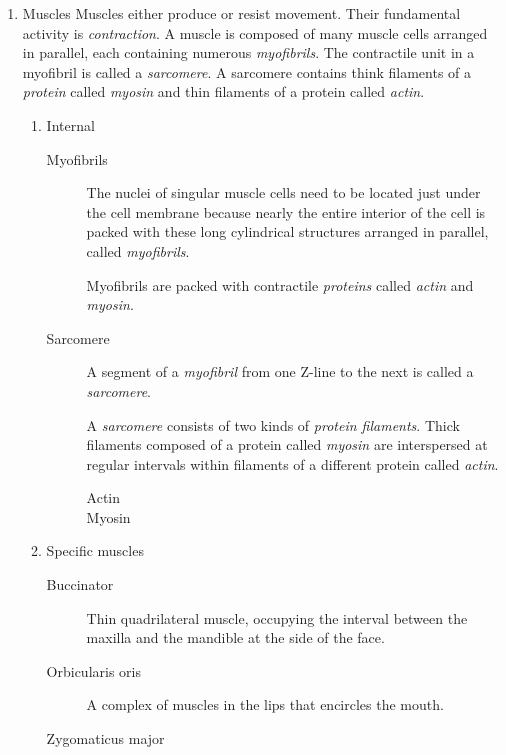 \documentclass[11pt]{article}
\begin{document}
\begin{enumerate}
\item Muscles
\label{sec:org2b0918c}
Muscles either produce or resist movement. Their fundamental activity is
\emph{contraction}. A muscle is composed of many muscle cells arranged in
parallel, each containing numerous \emph{myofibrils}. The contractile unit in a
myofibril is called a \emph{sarcomere}. A sarcomere contains think filaments of a
\emph{protein} called \emph{myosin} and thin filaments of a protein called \emph{actin}.

\begin{enumerate}
\item Internal
\label{sec:org9cbea4e}
\begin{description}
\item[{Myofibrils}] The nuclei of singular muscle cells need to be located just
under the cell membrane because nearly the entire interior of the cell
is packed with these long cylindrical structures arranged in parallel,
called \emph{myofibrils}.

Myofibrils are packed with contractile \emph{proteins} called \emph{actin} and
\emph{myosin}.

\item[{Sarcomere}] A segment of a \emph{myofibril} from one Z-line to the next is
called a \emph{sarcomere}.

A \emph{sarcomere} consists of two kinds of \emph{protein filaments}. Thick
filaments composed of a protein called \emph{myosin} are interspersed at
regular intervals within filaments of a different protein called
\emph{actin}.

\begin{description}
\item[{Actin}] 

\item[{Myosin}] 
\end{description}
\end{description}

\item Specific muscles
\label{sec:org65975dc}
\begin{description}
\item[{Buccinator}] Thin quadrilateral muscle, occupying the interval between
the maxilla and the mandible at the side of the face.

\item[{Orbicularis oris}] A complex of muscles in the lips that encircles the
mouth.

\item[{Zygomaticus major}] 


\end{description}
\end{enumerate}
\end{enumerate}
\end{document}
